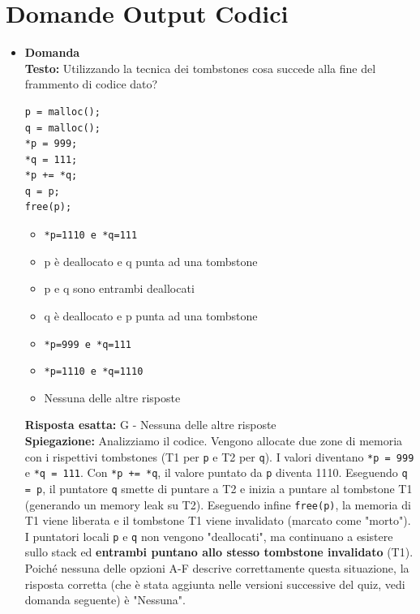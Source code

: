 \documentclass[12pt, a4paper]{article}
\newcounter{domandateoria}
\begin{document}
\section{Domande Output Codici}

\begin{itemize}
    \item {}\textbf{Domanda \thedomandateoria} \\
    \textbf{Testo:} Utilizzando la tecnica dei tombstones cosa succede alla fine del frammento di codice dato?
\begin{verbatim}
p = malloc();
q = malloc();
*p = 999;
*q = 111;
*p += *q;
q = p;
free(p);
\end{verbatim}
    \begin{itemize}
        \item[A)] \texttt{*p=1110 e *q=111}
        \item[B)] p è deallocato e q punta ad una tombstone
        \item[C)] p e q sono entrambi deallocati
        \item[D)] q è deallocato e p punta ad una tombstone
        \item[E)] \texttt{*p=999 e *q=111}
        \item[F)] \texttt{*p=1110 e *q=1110}
        \item[G)] Nessuna delle altre risposte
    \end{itemize}

    \newpage
    
    \textbf{Risposta esatta:} G - Nessuna delle altre risposte \\
    \textbf{Spiegazione:} Analizziamo il codice. Vengono allocate due zone di memoria con i rispettivi tombstones (T1 per \texttt{p} e T2 per \texttt{q}). I valori diventano \texttt{*p = 999} e \texttt{*q = 111}. Con \texttt{*p += *q}, il valore puntato da \texttt{p} diventa 1110. Eseguendo \texttt{q = p}, il puntatore \texttt{q} smette di puntare a T2 e inizia a puntare al tombstone T1 (generando un memory leak su T2). Eseguendo infine \texttt{free(p)}, la memoria di T1 viene liberata e il tombstone T1 viene invalidato (marcato come "morto"). I puntatori locali \texttt{p} e \texttt{q} non vengono "deallocati", ma continuano a esistere sullo stack ed \textbf{entrambi puntano allo stesso tombstone invalidato} (T1). Poiché nessuna delle opzioni A-F descrive correttamente questa situazione, la risposta corretta (che è stata aggiunta nelle versioni successive del quiz, vedi domanda seguente) è "Nessuna".
    \vspace{0.3cm}


\end{itemize}
\end{document}
